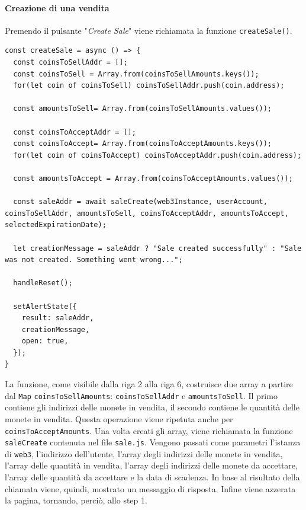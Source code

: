 \documentclass[a4paper]{article}
\begin{document}
        \paragraph{Creazione di una vendita}
        Premendo il pulsante "\emph{Create Sale}" viene richiamata la funzione \verb|createSale()|.
\begin{lstlisting}[style=ES6, title={Scelta di TextField da mostrare}]
const createSale = async () => {
  const coinsToSellAddr = [];
  const coinsToSell = Array.from(coinsToSellAmounts.keys());
  for(let coin of coinsToSell) coinsToSellAddr.push(coin.address);

  const amountsToSell= Array.from(coinsToSellAmounts.values());

  const coinsToAcceptAddr = [];
  const coinsToAccept= Array.from(coinsToAcceptAmounts.keys());
  for(let coin of coinsToAccept) coinsToAcceptAddr.push(coin.address);

  const amountsToAccept = Array.from(coinsToAcceptAmounts.values());
  
  const saleAddr = await saleCreate(web3Instance, userAccount, coinsToSellAddr, amountsToSell, coinsToAcceptAddr, amountsToAccept, selectedExpirationDate);

  let creationMessage = saleAddr ? "Sale created successfully" : "Sale was not created. Something went wrong...";
              
  handleReset();
  
  setAlertState({
    result: saleAddr,
    creationMessage,
    open: true,
  });
}\end{lstlisting}
        La funzione, come visibile dalla riga 2 alla riga 6, costruisce due array a partire dal \verb|Map| \verb|coinsToSellAmounts|: \verb|coinsToSellAddr| e \verb|amountsToSell|.
        Il primo contiene gli indirizzi delle monete in vendita, il secondo contiene le quantità delle monete in vendita. Questa operazione viene ripetuta anche per \verb|coinsToAcceptAmounts|.
        Una volta creati gli array, viene richiamata la funzione \verb|saleCreate| contenuta nel file \verb|sale.js|. Vengono passati come parametri l'istanza di \verb|web3|, l'indirizzo dell'utente, l'array degli indirizzi delle monete in vendita,
        l'array delle quantità in vendita, l'array degli indirizzi delle monete da accettare, l'array delle quantità da accettare e la data di scadenza.
        In base al risultato della chiamata viene, quindi, mostrato un messaggio di risposta. Infine viene azzerata la pagina, tornando, perciò, allo step 1.
\end{document}
